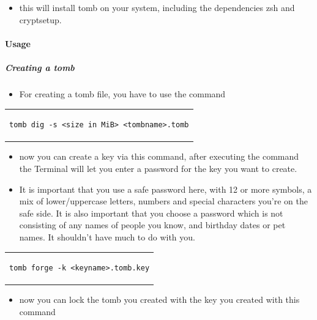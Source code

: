 \documentclass[a4paper,10pt]{article}
\begin{document}
\begin{itemize}[leftmargin=*]
\item this will install tomb on your system, including the dependencies zsh and cryptsetup.
\end{itemize}

\paragraph{Usage}

\subparagraph{Creating a tomb}

\begin{itemize}[leftmargin=*]
\item For creating a tomb file, you have to use the command
\end{itemize}

\begin{center}
\begin{tabular}{c}
\begin{lstlisting}
tomb dig -s <size in MiB> <tombname>.tomb
\end{lstlisting}
\end{tabular}
\end{center}

\begin{itemize}[leftmargin=*]
\item now you can create a key via this command, after executing the command the Terminal will let you enter a password for the key you want to create.
\item It is important that you use a safe password here, with 12 or more symbols, a mix of lower/uppercase letters, numbers and special characters you're on the safe side. It is also important that you choose a password which is not consisting of any names of people you know, and birthday dates or pet names. It shouldn't have much to do with you.
\end{itemize}

\begin{center}
\begin{tabular}{c}
\begin{lstlisting}
tomb forge -k <keyname>.tomb.key
\end{lstlisting}
\end{tabular}
\end{center}

\begin{itemize}[leftmargin=*]
\item now you can lock the tomb you created with the key you created with this command
\end{itemize}
\end{document}
